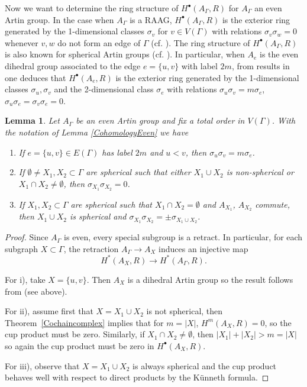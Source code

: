 \documentclass[10pt, oneside]{amsart}
\newtheorem{lemma}[theorem]{Lemma}
\theoremstyle{definition}
\theoremstyle{remark}
\theoremstyle{plain}
\begin{document}
Now we want to determine the ring structure of $H^\bullet(A_\Gamma,R)$ for $A_\Gamma$ an even Artin group. In the case when $A_\Gamma$ is a RAAG, $H^\bullet(A_\Gamma,R)$ is the exterior ring generated by the 1-dimensional classes $\sigma_v$ for $v\in V(\Gamma)$ with relations $\sigma_v\sigma_w=0$ whenever $v,w$ do not form an edge of $\Gamma$ (cf. \cite[Proposition 2.4]{Koberda 2022}). 
The ring structure of $H^\bullet(A_\Gamma,R)$ is also known for spherical Artin groups (cf. \cite{Landi 2000}). In particular, when $A_e$ is the even dihedral group associated to the edge $e=\{u,v\}$ with label $2m$, from results in \cite{Landi 2000} one deduces that $H^\bullet(A_e,R)$ is the exterior ring generated by the 1-dimensional classes $\sigma_u,\sigma_v$ and the 2-dimensional class $\sigma_e$ with relations $\sigma_u\sigma_v=m\sigma_e$, $\sigma_u\sigma_e=\sigma_v\sigma_e=0$. 



\begin{lemma}\label{CupprodLemma}
	Let $A_\Gamma$ be an even Artin group and fix a total order in $V(\Gamma)$. With the notation of Lemma \ref{CohomologyEven} we have
	\begin{enumerate}
		\item[i)] If $e=\{u,v\}\in E(\Gamma)$ has label $2m$ and $u<v$, then $\sigma_u\sigma_v=m\sigma_{e}$.
		\item[ii)] If $\emptyset\neq X_1,X_2\subset\Gamma$ are spherical such that either $X_1\cup X_2$ is non-spherical or $X_1\cap X_2\neq\emptyset$, then $\sigma_{X_1}\sigma_{X_2}=0$.
		\item[iii)] If $X_1,X_2\subset\Gamma$ are spherical such that $X_1\cap X_2=\emptyset$ and $A_{X_1}$, $A_{X_2}$ commute, then $X_1\cup X_2$ is spherical and $\sigma_{X_1}\sigma_{X_2}=\pm\sigma_{X_1\cup X_2}$.
	\end{enumerate}
\end{lemma}
\begin{proof}
	Since $A_\Gamma$ is even, every special subgroup is a retract. In particular, for each subgraph $X\subset\Gamma$, the retraction $A_\Gamma\to A_X$ induces an injective map
	$$H^\ast(A_X,R)\to H^\ast(A_\Gamma,R).$$
	
	For i), take $X=\{u,v\}$. Then $A_X$ is a dihedral Artin group so the result follows from \cite{Landi 2000} (see above).
	
	For ii), assume first that $X=X_1\cup X_2$ is not spherical, then Theorem~\ref{Cochaincomplex} implies that for $m=|X|$, $H^{m}(A_X,R)=0$, so the cup product must be zero. Similarly, if $X_1\cap X_2\neq\emptyset$, then $|X_1|+|X_2|>m=|X|$ so again the cup product must be zero in $H^\bullet(A_X,R)$.
	
	For iii), observe that $X=X_1\cup X_2$ is always spherical and the cup product behaves well with respect to direct products by the Künneth formula.
\end{proof}
\end{document}
